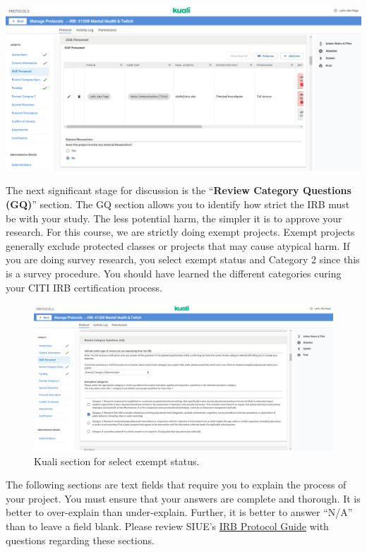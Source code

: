 \documentclass[
]{book}
\begin{document}
\href{https://siue.kuali.co/protocols/portal/protocols}{\includegraphics[width=1\textwidth,height=\textheight]{images/siue-personnel.png}}

The next significant stage for discussion is the ``\textbf{Review Category Questions (GQ)}'' section. The GQ section allows you to identify how strict the IRB must be with your study. The less potential harm, the simpler it is to approve your research. For this course, we are strictly doing exempt projects. Exempt projects generally exclude protected classes or projects that may cause atypical harm. If you are doing survey research, you select exempt status and Category 2 since this is a survey procedure. You should have learned the different categories curing your CITI IRB certification process.

\begin{figure}
\centering
\includegraphics[width=1\textwidth,height=\textheight]{images/kuali-exempt.png}
\caption{Kuali section for select exempt status.}
\end{figure}

The following sections are text fields that require you to explain the process of your project. You must ensure that your answers are complete and thorough. It is better to over-explain than under-explain. Further, it is better to answer ``N/A'' than to leave a field blank. Please review SIUE's \href{https://www.siue.edu/compliance/human-subjects/pdf/IRBProtocolGuidance.pdf}{IRB Protocol Guide} with questions regarding these sections.
\end{document}
